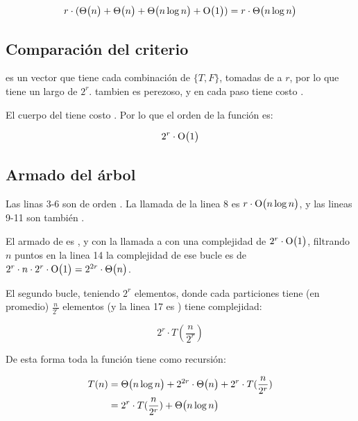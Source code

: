 \[ r \cdot (\mathrm{\Theta}\bigl(n\bigr)+\mathrm{\Theta}\bigl(n\bigr)+\mathrm{\Theta}\bigl(n \log{n}\bigr) + \mathrm{O}\bigl(1\bigr)) \\
   = r \cdot \mathrm{\Theta}\bigl(n \log{n}\bigr)  \]

\subsection{Comparación del criterio}


 es un vector que tiene cada combinación de \(\{ T, F \}\),
tomadas de a \(r\), por lo que tiene un largo de \(2^r\). 
tambien es perezoso, y en cada paso tiene costo .

El cuerpo del  tiene costo . Por lo que el orden de la función es:

\[ 2^r \cdot \mathrm{O}\bigl(1\bigr) \]


\subsection{Armado del árbol}


Las linas 3-6 son de orden . La llamada de la linea 8 es
\(r \cdot \mathrm{O}\bigl(n \log{n}\bigr)\), y las lineas 9-11 son también .

El armado de  es , y con la llamada
a  con una complejidad de \(2^r \cdot \mathrm{O}\bigl(1\bigr)\),
filtrando \(n\) puntos en la linea 14 la complejidad de ese bucle es de
\( 2^r \cdot n \cdot 2^r \cdot \mathrm{O}\bigl(1\bigr) = 2^{2r} \cdot \mathrm{\Theta}\bigl(n\bigr)\).

El segundo bucle, teniendo  \(2^r\)
elementos, donde cada particiones tiene (en promedio)
\(\frac{n}{2^r}\) elementos (y la linea 17 es ) tiene complejidad:

\[2^r \cdot T(\frac{n}{2^r}) \]



De esta forma toda la función tiene como recursión:

\begin{equation*}
  \begin{split}
   T(n) &= \mathrm{\Theta}\bigl(n \log{n}\bigr) + 2^{2r} \cdot \mathrm{\Theta}\bigl(n\bigr) + 2^r \cdot
   T(\frac{n}{2^r}) \\
        &= 2^r \cdot T(\frac{n}{2^r}) + \mathrm{\Theta}\bigl(n \log{n}\bigr)
  \end{split}
\end{equation*}

